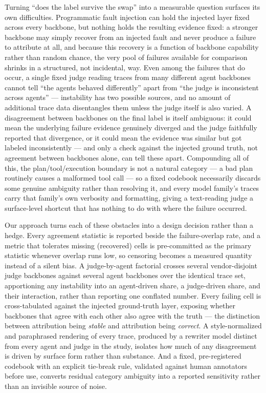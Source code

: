 \documentclass[11pt]{article}
\begin{document}
Turning ``does the label survive the swap'' into a measurable question surfaces its own difficulties. Programmatic fault injection can hold the injected layer fixed across every backbone, but nothing holds the resulting evidence fixed: a stronger backbone may simply recover from an injected fault and never produce a failure to attribute at all, and because this recovery is a function of backbone capability rather than random chance, the very pool of failures available for comparison shrinks in a structured, not incidental, way. Even among the failures that do occur, a single fixed judge reading traces from many different agent backbones cannot tell ``the agents behaved differently'' apart from ``the judge is inconsistent across agents'' --- instability has two possible sources, and no amount of additional trace data disentangles them unless the judge itself is also varied. A disagreement between backbones on the final label is itself ambiguous: it could mean the underlying failure evidence genuinely diverged and the judge faithfully reported that divergence, or it could mean the evidence was similar but got labeled inconsistently --- and only a check against the injected ground truth, not agreement between backbones alone, can tell these apart. Compounding all of this, the plan/tool/execution boundary is not a natural category --- a bad plan routinely causes a malformed tool call --- so a fixed codebook necessarily discards some genuine ambiguity rather than resolving it, and every model family's traces carry that family's own verbosity and formatting, giving a text-reading judge a surface-level shortcut that has nothing to do with where the failure occurred.

Our approach turns each of these obstacles into a design decision rather than a hedge. Every agreement statistic is reported beside the failure-overlap rate, and a metric that tolerates missing (recovered) cells is pre-committed as the primary statistic whenever overlap runs low, so censoring becomes a measured quantity instead of a silent bias. A judge-by-agent factorial crosses several vendor-disjoint judge backbones against several agent backbones over the identical trace set, apportioning any instability into an agent-driven share, a judge-driven share, and their interaction, rather than reporting one conflated number. Every failing cell is cross-tabulated against the injected ground-truth layer, exposing whether backbones that agree with each other also agree with the truth --- the distinction between attribution being \emph{stable} and attribution being \emph{correct}. A style-normalized and paraphrased rendering of every trace, produced by a rewriter model distinct from every agent and judge in the study, isolates how much of any disagreement is driven by surface form rather than substance. And a fixed, pre-registered codebook with an explicit tie-break rule, validated against human annotators before use, converts residual category ambiguity into a reported sensitivity rather than an invisible source of noise.
\end{document}
